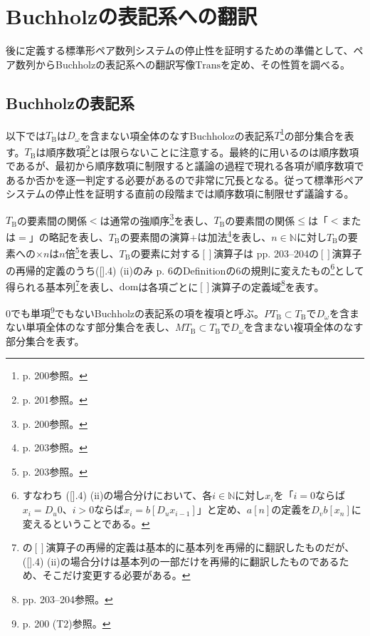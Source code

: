 \documentclass[dvipdfmx,uplatex]{jsarticle}
\theoremstyle{customnonumberbreakfortheorem}
\theoremstyle{customnonumberbreakforproof}
\begin{document}
\section{Buchholzの表記系への翻訳}

後に定義する標準形ペア数列システムの停止性を証明するための準備として、ペア数列からBuchholzの表記系への翻訳写像\(\textrm{Trans}\)を定め、その性質を調べる。


\subsection{Buchholzの表記系}

以下では\(T_{\textrm{B}}\)は\(D_{\omega}\)を含まない項全体のなすBuchholozの表記系\(T\)\footnote{\cite{buc1} p. 200参照。}の部分集合を表す。\(T_{\textrm{B}}\)は順序数項\footnote{\cite{buc1} p. 201参照。}とは限らないことに注意する。最終的に用いるのは順序数項であるが、最初から順序数項に制限すると議論の過程で現れる各項が順序数項であるか否かを逐一判定する必要があるので非常に冗長となる。従って標準形ペアシステムの停止性を証明する直前の段階までは順序数項に制限せず議論する。

\(T_{\textrm{B}}\)の要素間の関係\(<\)は通常の強順序\footnote{\cite{buc1} p. 200参照。}を表し、\(T_{\textrm{B}}\)の要素間の関係\(\leq\)は「\(<\)または\(=\)」の略記を表し、\(T_{\textrm{B}}\)の要素間の演算\(+\)は加法\footnote{\cite{buc1} p. 203参照。}を表し、\(n \in \mathbb
{N}\)に対し\(T_{\textrm{B}}\)の要素への\(\times n\)は\(n\)倍\footnote{\cite{buc1} p. 203参照。}を表し、\(T_{\textrm{B}}\)の要素に対する\([]\)演算子は\cite{buc1} pp. 203--204の\([]\)演算子の再帰的定義のうち([].4) (ii)のみ\cite{buc2} p. 6のDefinitionの6の規則に変えたもの\footnote{すなわち\cite{buc1} ([].4) (ii)の場合分けにおいて、各\(i \in \mathbb{N}\)に対し\(x_i\)を「\(i = 0\)ならば\(x_i = D_u 0\)、\(i > 0\)ならば\(x_i = b[D_u x_{i-1}]\)」と定め、\(a[n]\)の定義を\(D_v b[x_n]\)に変えるということである。}として得られる基本列\footnote{\cite{buc1}の\([]\)演算子の再帰的定義は基本的に基本列を再帰的に翻訳したものだが、([].4) (ii)の場合分けは基本列の一部だけを再帰的に翻訳したものであるため、そこだけ変更する必要がある。}を表し、\(\textrm{dom}\)は各項ごとに\([]\)演算子の定義域\footnote{\cite{buc1} pp. 203--204参照。}を表す。

\(0\)でも単項\footnote{\cite{buc1} p. 200 (T2)参照。}でもないBuchholzの表記系の項を複項と呼ぶ。\(PT_{\textrm{B}} \subset T_{\textrm{B}}\)で\(D_{\omega}\)を含まない単項全体のなす部分集合を表し、\(MT_{\textrm{B}} \subset T_{\textrm{B}}\)で\(D_{\omega}\)を含まない複項全体のなす部分集合を表す。
\end{document}
